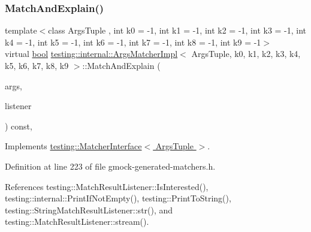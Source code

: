 \mbox{\label{classtesting_1_1internal_1_1ArgsMatcherImpl_a60383b3073a61f9d82cbf31fe19e6bfa}} 
\subsubsection{\texorpdfstring{Match\+And\+Explain()}{MatchAndExplain()}}
{\footnotesize\ttfamily template$<$class Args\+Tuple , int k0 = -\/1, int k1 = -\/1, int k2 = -\/1, int k3 = -\/1, int k4 = -\/1, int k5 = -\/1, int k6 = -\/1, int k7 = -\/1, int k8 = -\/1, int k9 = -\/1$>$ \\
virtual \hyperlink{classbool}{bool} \hyperlink{classtesting_1_1internal_1_1ArgsMatcherImpl}{testing\+::internal\+::\+Args\+Matcher\+Impl}$<$ Args\+Tuple, k0, k1, k2, k3, k4, k5, k6, k7, k8, k9 $>$\+::Match\+And\+Explain (\begin{DoxyParamCaption}\item[{Args\+Tuple}]{args,  }\item[{\hyperlink{classtesting_1_1MatchResultListener}{Match\+Result\+Listener} $\ast$}]{listener }\end{DoxyParamCaption}) const\hspace{0.3cm}{\ttfamily [inline]}, {\ttfamily [virtual]}}



Implements \hyperlink{classtesting_1_1MatcherInterface_a296b43607cd99d60365f0e6a762777cf}{testing\+::\+Matcher\+Interface$<$ Args\+Tuple $>$}.



Definition at line 223 of file gmock-\/generated-\/matchers.\+h.



References testing\+::\+Match\+Result\+Listener\+::\+Is\+Interested(), testing\+::internal\+::\+Print\+If\+Not\+Empty(), testing\+::\+Print\+To\+String(), testing\+::\+String\+Match\+Result\+Listener\+::str(), and testing\+::\+Match\+Result\+Listener\+::stream().


